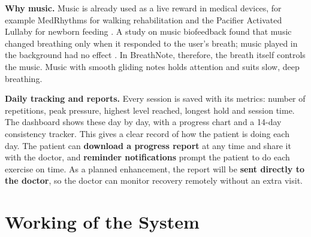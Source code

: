 \documentclass[12pt,a4paper]{article}
\begin{document}
\textbf{Why music.} Music is already used as a live reward in medical devices, for example MedRhythms for walking rehabilitation \cite{medrhythms} and the Pacifier Activated Lullaby for newborn feeding \cite{pal}. A study on music biofeedback found that music changed breathing only when it responded to the user's breath; music played in the background had no effect \cite{bhandari}. In BreathNote, therefore, the breath itself controls the music. Music with smooth gliding notes holds attention and suits slow, deep breathing.

\textbf{Daily tracking and reports.} Every session is saved with its metrics: number of repetitions, peak pressure, highest level reached, longest hold and session time. The dashboard shows these day by day, with a progress chart and a 14-day consistency tracker. This gives a clear record of how the patient is doing each day. The patient can \textbf{download a progress report} at any time and share it with the doctor, and \textbf{reminder notifications} prompt the patient to do each exercise on time. As a planned enhancement, the report will be \textbf{sent directly to the doctor}, so the doctor can monitor recovery remotely without an extra visit.

\section{Working of the System}
\end{document}
